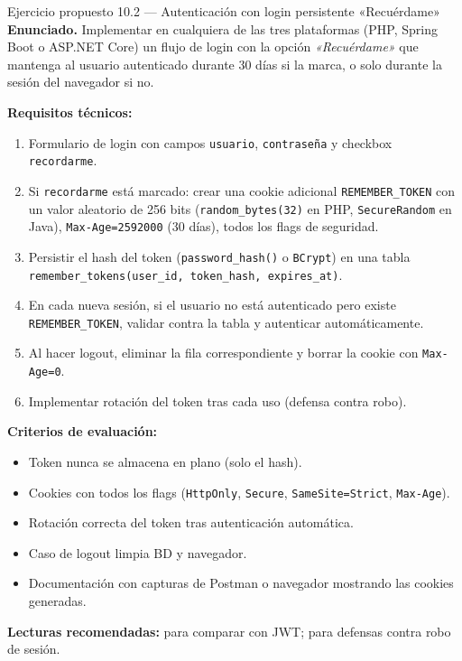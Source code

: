 \begin{cajaejercicio}{Ejercicio propuesto 10.2 --- Autenticación con login persistente «Recuérdame»}
\textbf{Enunciado.} Implementar en cualquiera de las tres plataformas
(PHP, Spring Boot o ASP.NET Core) un flujo de login con la opción
\emph{«Recuérdame»} que mantenga al usuario autenticado durante 30
días si la marca, o solo durante la sesión del navegador si no.

\textbf{Requisitos técnicos:}
\begin{enumerate}
\item Formulario de login con campos \texttt{usuario},
\texttt{contraseña} y checkbox \texttt{recordarme}.
\item Si \texttt{recordarme} está marcado: crear una cookie
adicional \texttt{REMEMBER\_TOKEN} con un valor aleatorio de 256 bits
(\texttt{random\_bytes(32)} en PHP, \texttt{SecureRandom} en Java),
\texttt{Max-Age=2592000} (30 días), todos los flags de seguridad.
\item Persistir el hash del token (\texttt{password\_hash()} o
\texttt{BCrypt}) en una tabla \texttt{remember\_tokens(user\_id,
token\_hash, expires\_at)}.
\item En cada nueva sesión, si el usuario no está autenticado pero
existe \texttt{REMEMBER\_TOKEN}, validar contra la tabla y
autenticar automáticamente.
\item Al hacer logout, eliminar la fila correspondiente y borrar la
cookie con \texttt{Max-Age=0}.
\item Implementar rotación del token tras cada uso (defensa contra
robo).
\end{enumerate}

\textbf{Criterios de evaluación:}
\begin{itemize}
\item Token nunca se almacena en plano (solo el hash).
\item Cookies con todos los flags (\texttt{HttpOnly},
\texttt{Secure}, \texttt{SameSite=Strict}, \texttt{Max-Age}).
\item Rotación correcta del token tras autenticación automática.
\item Caso de logout limpia BD y navegador.
\item Documentación con capturas de Postman o navegador mostrando
las cookies generadas.
\end{itemize}

\textbf{Lecturas recomendadas:} \cite{jones2015jwt} para
comparar con JWT; \cite{ortega2022securecoding} para defensas
contra robo de sesión.
\end{cajaejercicio}

